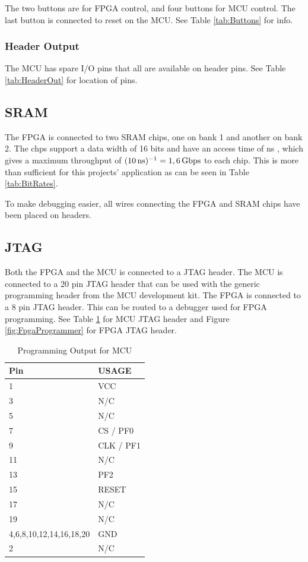 The two buttons are for FPGA control, and four buttons for MCU control.
The last button is connected to reset on the MCU.
See Table \ref{tab:Buttons} for info.

\subsubsection{Header Output}
The MCU has spare I/O pins that all are available on header pins.
See Table \ref{tab:HeaderOut} for location of pins.

\subsection{SRAM}
\label{subsec:sram}
The FPGA is connected to two SRAM chips, one on bank 1 and another on bank 2.
The chps support a data width of 16 bits and have an access time of \unit[10]{ns} \cite{sramdatasheet}, which gives a maximum throughput of $(\unit[10]{ns})^{-1} = \unit[1,6]{Gbps}$ to each chip.
This is more than sufficient for this projects' application as can be seen in Table \ref{tab:BitRates}.

To make debugging easier, all wires connecting the FPGA and SRAM chips have been placed on headers. 

\subsection{JTAG}
Both the FPGA and the MCU is connected to a JTAG header.
The MCU is connected to a 20 pin JTAG header that can be used with the generic programming header from the MCU development kit.
The FPGA is connected to a 8 pin JTAG header.
This can be routed to a debugger used for FPGA programming.
See Table \ref{tab:EfmProgrammer} for MCU JTAG header and Figure \ref{fig:FpgaProgrammer} for FPGA JTAG header.

\begin{table}[]
    \centering
    \begin{tabular}{ll}
        Pin                     & USAGE     \\
        \hline
        1                       & VCC       \\
        3                       & N/C       \\
        5                       & N/C       \\
        7                       & CS / PF0  \\
        9                       & CLK / PF1 \\
        11                      & N/C       \\
        13                      & PF2       \\
        15                      & RESET     \\
        17                      & N/C       \\
        19                      & N/C       \\
        4,6,8,10,12,14,16,18,20 & GND       \\
        2                       & N/C
    \end{tabular}
    \caption{Programming Output for MCU}
    \label{tab:EfmProgrammer}
\end{table}

